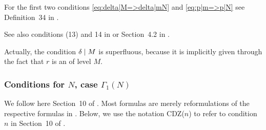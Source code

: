 \documentclass{article}
\begin{document}
For the first two conditions \eqref{eq:delta|M=>delta|mN} and
\eqref{eq:p|m=>p|N} see Definition~34 in
\cite{Radu_RamanujanKolberg_2015}.

\begin{AdditionalInformation}
  See also conditions (13) and 14 in
  \cite{Radu_AlgorithmicApproachRamanujanCongruences_2009} or
  Section~4.2 in \cite{Radu_PhD_2010}.
\end{AdditionalInformation}

Actually, the condition $\delta \mid M$ is superfluous, because
it is implicitly given through the fact that $r$ is an  of level $M$.



\subsubsection{Conditions for $N$, case $\Gamma_1(N)$}

We follow here Section~10 of
\cite{ChenDuZhao_FindingModularFunctionsRamanujan_2019}.
%
Most formulas are merely reformulations of the respective formulas in
\cite{ChenDuZhao_FindingModularFunctionsRamanujan_2019}.
%
Below, we use the notation CDZ($n$) to refer to condition $n$ in
Section~10 of \cite{ChenDuZhao_FindingModularFunctionsRamanujan_2019}.
\end{document}
